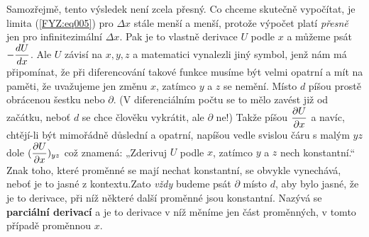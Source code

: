     Samozřejmě, tento výsledek není zcela přesný. Co chceme skutečně vypočítat, je limita 
    (\ref{FYZ:eq005}) pro \(\Delta x\) stále menší a menší, protože výpočet platí \emph{přesně} 
    jen pro infinitezimální \(\Delta x\). Pak je to vlastně derivace \(U\) podle \(x\) a můžeme 
    psát \(-\dfrac{d U}{d x}\). Ale \(U\) závisí na \(x, y, z\) a matematici vynalezli jiný symbol, jenž 
    nám má připomínat, že při diferencování takové funkce musíme být velmi opatrní a mít na paměti, 
    že uvažujeme jen změnu \(x\), zatímco \(y\) a \(z\) se nemění. Místo \(d\) píšou prostě 
    obrácenou šestku nebo \(\partial\). (V diferenciálním počtu se to mělo zavést již od začátku, 
    neboť \(d\) se chce člověku vykrátit, ale \(\partial\) ne!) Takže píšou \(\dfrac{\partial U}{\partial x}\) a 
    navíc, chtějí-li být mimořádně důslední a opatrní, napíšou vedle svislou čáru s malým \(yz\) 
    dole  \((\dfrac{\partial U}{\partial x})_{yz}\) což znamená: „Zderivuj \(U\) podle \(x\), zatímco \(y\) a \(z\) 
    nech konstantní.“ Znak toho, které proměnné se mají nechat konstantní, se obvykle vynechává, 
    neboť je to jasné z kontextu.Zato \emph{vždy} budeme psát \(\partial\) místo \(d\), aby bylo 
    jasné, že je to derivace, při níž některé další proměnné jsou konstantní. Nazývá se 
    \textbf{parciální derivací} a je to derivace v níž měníme jen část proměnných, v tomto případě 
    proměnnou \(x\).
    
